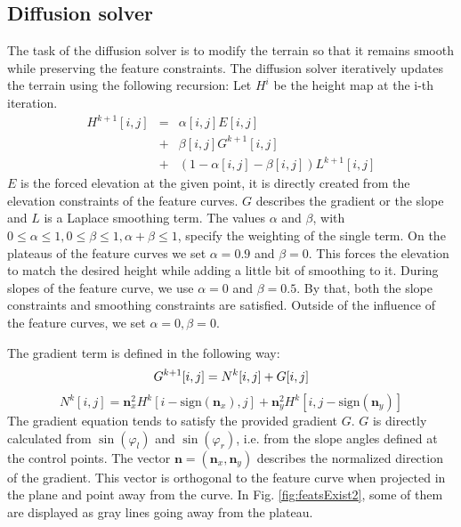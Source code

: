 \documentclass[journal, letterpaper]{IEEEtran}
\begin{document}
\subsection{Diffusion solver}\label{DiffusionSolver}
The task of the diffusion solver is to modify the terrain so that it remains smooth while preserving the feature constraints.
The diffusion solver iteratively updates the terrain using the following recursion: Let $H^i$ be the height map at the i-th iteration.
\begin{equation}
\begin{array}{rcl}
	H^{k+1}[i,j] &=& \alpha[i,j] E[i,j]  \\
	             &+& \beta[i,j] G^{k+1}[i,j]  \\
							 &+& (1-\alpha[i,j]-\beta[i,j]) L^{k+1}[i,j]
\end{array}
\label{eq:Diffusion1}
\end{equation}
$E$ is the forced elevation at the given point, it is directly created from the elevation constraints of the feature curves.
$G$ describes the gradient or the slope and $L$ is a Laplace smoothing term.
The values $\alpha$ and $\beta$, with $0\leq\alpha\leq 1, 0\leq\beta\leq 1, \alpha+\beta\leq 1$, specify the weighting of the single term. On the plateaus of the feature curves we set $\alpha=0.9$ and $\beta=0$. This forces the elevation to match the desired height while adding a little bit of smoothing to it. During slopes of the feature curve, we use $\alpha=0$ and $\beta=0.5$. By that, both the slope constraints and smoothing constraints are satisfied. Outside of the influence of the feature curves, we set $\alpha=0, \beta=0$.

The gradient term is defined in the following way:
\begin{equation}
	G^{k+1}[i,j] = N^k[i,j]+G[i,j] \newline
\label{eq:Diffusion2}
\end{equation}
\begin{equation}
	N^k[i,j] = \textbf{n}_x^2 H^k[i-\text{sign}(\textbf{n}_x),j] + \textbf{n}_y^2 H^k[i, j-\text{sign}(\textbf{n}_y)]
\label{eq:Diffusion3}
\end{equation}
The gradient equation tends to satisfy the provided gradient $G$. $G$ is directly calculated from $\sin(\varphi_l)$ and $\sin(\varphi_r)$, i.e. from the slope angles defined at the control points.
The vector $\textbf{n}=(\textbf{n}_x,\textbf{n}_y)$ describes the normalized direction of the gradient. This vector is orthogonal to the feature curve when projected in the plane and point away from the curve. In Fig. \ref{fig:featsExist2}, some of them are displayed as gray lines going away from the plateau.
\end{document}
